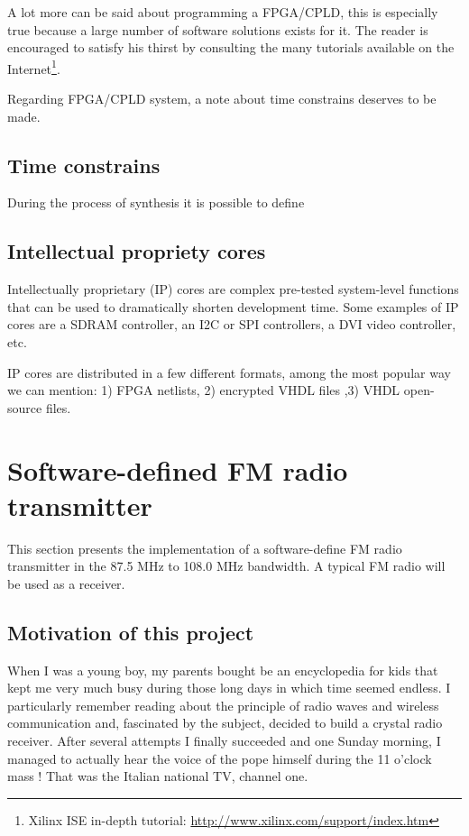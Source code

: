 \documentclass[13pt]{extreport}
\begin{document}
A lot more can be said about programming a FPGA/CPLD, this is especially true because a large number of software solutions exists for it. The reader is encouraged to satisfy his thirst by consulting the many tutorials available on the Internet\footnote{Xilinx ISE in-depth tutorial: \scriptsize\url{http://www.xilinx.com/support/index.htm}}.

Regarding FPGA/CPLD system, a note about time constrains deserves to be made.

\subsection{Time constrains}
During the process of synthesis it is possible to define

\subsection{Intellectual propriety cores}
Intellectually proprietary (IP) cores are complex pre-tested system-level functions that can be used to dramatically shorten development time. Some examples of IP cores are a SDRAM controller, an I2C or SPI controllers, a DVI video controller, etc.

IP cores are distributed in a few different formats, among the most popular way we can mention: 1) FPGA netlists, 2) encrypted VHDL files ,3) VHDL open-source files.

\section{Software-defined FM radio transmitter}
This section presents the implementation of a software-define FM radio transmitter in the 87.5 MHz to 108.0 MHz bandwidth. A typical FM radio will be used as a receiver.

\subsection{Motivation of this project}
When I was a young boy, my parents bought be an encyclopedia for kids that kept me very much busy during those long days in which time seemed endless. I particularly remember reading about the principle of radio waves and wireless communication and, fascinated by the subject, decided to build a crystal radio receiver. After several attempts I finally succeeded and one Sunday morning, I managed to actually hear the voice of the pope himself during the 11 o'clock mass ! That was the Italian national TV, channel one.
\end{document}
